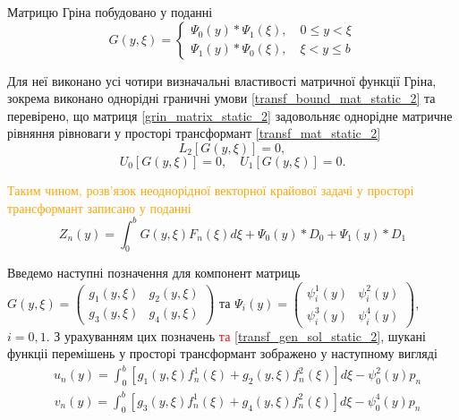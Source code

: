 Матрицю Гріна побудовано у поданні
\begin{equation}\label{grin_matrix_static_2}
    G(y,\xi) = 
    \begin{cases}
        \Psi_0(y) * \Psi_1(\xi), \quad 0 \le y < \xi \\
        \Psi_1(y) * \Psi_0(\xi), \quad \xi < y \le b
    \end{cases}
\end{equation}

Для неї виконано усі чотири визначальні властивості матричної функції Гріна, зокрема виконано однорідні граничні умови \eqref{transf_bound_mat_static_2}
та перевірено, що матриця \eqref{grin_matrix_static_2} задовольняє однорідне матричне рівняння рівноваги у просторі трансформант \eqref{transf_mat_static_2}
\begin{equation*}
    L_2\left[  G(y, \xi) \right] = 0,
\end{equation*}
\begin{equation*}
    U_0\left[ G(y, \xi) \right] = 0, \quad  U_1\left[ G(y, \xi) \right] = 0.
\end{equation*}

\textcolor{orange}{Таким чином, розв'язок неоднорідної векторної крайової задачі у просторі трансформант записано у поданні \cite{popov_2}}
\begin{equation}
    Z_n(y) = \int_0^b G(y,\xi) F_n(\xi) d\xi + \Psi_0(y) * D_0 + \Psi_1(y) * D_1
\end{equation}

Введемо наступні позначення для компонент матриць \newline $G(y, \xi) = \begin{pmatrix}
    g_1(y,\xi) & g_2(y,\xi) \\
    g_3(y,\xi) & g_4(y,\xi)
\end{pmatrix}$ та $\Psi_i(y) = \begin{pmatrix}
    \psi_i^1(y) & \psi_i^2(y) \\
    \psi_i^3(y) & \psi_i^4(y)
\end{pmatrix}$, $i=0,1$.
\newline З урахуванням цих позначень \textcolor{red}{та \eqref{transf_gen_sol_static_2}}, шукані функціі перемішень у просторі трансформант зображено у наступному вигляді
\begin{align}\label{transf_sol_u_static_2}
    &u_n(y) = \int_0^b \left[g_1(y, \xi)f_n^1(\xi) + g_2(y, \xi)f_n^2(\xi) \right]d\xi - \psi_0^2(y) p_n
\end{align}
\begin{align}\label{transf_sol_v_static_2}
    &v_n(y) = \int_0^b \left[g_3(y, \xi)f_n^1(\xi) + g_4(y, \xi)f_n^2(\xi) \right]d\xi - \psi_0^4(y) p_n
\end{align}

